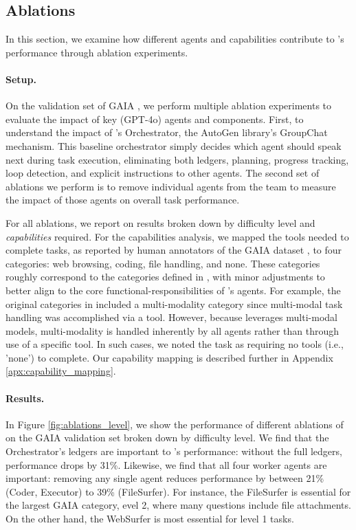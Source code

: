 \subsection{Ablations}
In this section, we examine how different agents and capabilities contribute to \team's performance through ablation experiments.

\paragraph{Setup.} On the validation set of GAIA \cite{mialon2023gaiabenchmarkgeneralai}, we perform multiple ablation experiments to evaluate the impact of key \team (GPT-4o) agents and components. First, to understand the impact of \team's Orchestrator, the AutoGen\cite{wu2023autogen} library's GroupChat mechanism. This baseline orchestrator simply decides which agent should speak next during task execution, eliminating both ledgers, planning, progress tracking, loop detection, and explicit instructions to other agents. The second set of ablations we perform is to remove individual agents from the \team team to measure the impact of those agents on overall task performance.

For all ablations, we report on results broken down by difficulty level and \emph{capabilities} required. For the capabilities analysis, we mapped the tools needed to complete tasks, as reported by human annotators of the GAIA dataset \cite{mialon2023gaiabenchmarkgeneralai}, to four categories: web browsing, coding, file handling, and none. These categories roughly correspond to the categories defined in \cite{mialon2023gaiabenchmarkgeneralai}, with minor adjustments to better align to the core functional-responsibilities of \team's agents. For example, the original categories in \cite{mialon2023gaiabenchmarkgeneralai} included a multi-modality category since multi-modal task handling was accomplished via a tool. However, because \team leverages multi-modal models, multi-modality is handled inherently by all agents rather than through use of a specific tool. In such cases, we noted the task as requiring no tools (i.e., 'none') to complete. Our capability mapping is described further in Appendix \ref{apx:capability_mapping}.



\paragraph{Results.} In Figure \ref{fig:ablations_level}, we show the performance of different ablations of \team on the GAIA validation set broken down by difficulty level. We find that the Orchestrator's ledgers are important to \team's performance: without the full ledgers, performance drops by 31\%. 
Likewise, we find that all four worker agents are important: removing any single agent reduces performance by between 21\% (Coder, Executor) to 39\% (FileSurfer). For instance, the FileSurfer is essential for the largest GAIA category, evel 2, where many questions include file attachments. On the other hand, the WebSurfer is most essential for level 1 tasks. 

